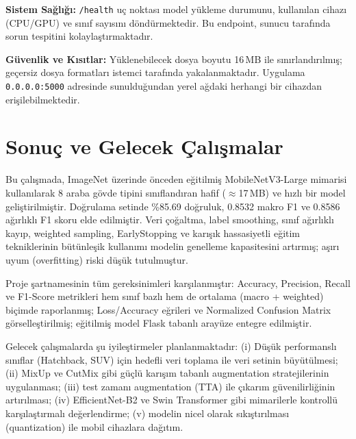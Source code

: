 \documentclass[conference]{IEEEtran}
\begin{document}
\textbf{Sistem Sağlığı:} \texttt{/health} uç noktası model yükleme
durumunu, kullanılan cihazı (CPU/GPU) ve sınıf sayısını döndürmektedir.
Bu endpoint, sunucu tarafında sorun tespitini kolaylaştırmaktadır.

\textbf{Güvenlik ve Kısıtlar:} Yüklenebilecek dosya boyutu 16\,MB ile
sınırlandırılmış; geçersiz dosya formatları istemci tarafında
yakalanmaktadır. Uygulama \texttt{0.0.0.0:5000} adresinde sunulduğundan
yerel ağdaki herhangi bir cihazdan erişilebilmektedir.

\section{Sonuç ve Gelecek Çalışmalar}

Bu çalışmada, ImageNet üzerinde önceden eğitilmiş MobileNetV3-Large
mimarisi kullanılarak 8 araba gövde tipini sınıflandıran hafif
($\approx$17\,MB) ve hızlı bir model geliştirilmiştir. Doğrulama
setinde \%85.69 doğruluk, 0.8532 makro F1 ve 0.8586 ağırlıklı F1
skoru elde edilmiştir. Veri çoğaltma, label smoothing, sınıf ağırlıklı
kayıp, weighted sampling, EarlyStopping ve karışık hassasiyetli eğitim
tekniklerinin bütünleşik kullanımı modelin genelleme kapasitesini
artırmış; aşırı uyum (overfitting) riski düşük tutulmuştur.

Proje şartnamesinin tüm gereksinimleri karşılanmıştır:
Accuracy, Precision, Recall ve F1-Score metrikleri hem sınıf
bazlı hem de ortalama (macro + weighted) biçimde raporlanmış;
Loss/Accuracy eğrileri ve Normalized Confusion Matrix görselleştirilmiş;
eğitilmiş model Flask tabanlı arayüze entegre edilmiştir.

Gelecek çalışmalarda şu iyileştirmeler planlanmaktadır: (i) Düşük
performanslı sınıflar (Hatchback, SUV) için hedefli veri toplama ile
veri setinin büyütülmesi; (ii) MixUp ve CutMix gibi güçlü karışım
tabanlı augmentation stratejilerinin uygulanması; (iii) test zamanı
augmentation (TTA) ile çıkarım güvenilirliğinin artırılması; (iv)
EfficientNet-B2 ve Swin Transformer gibi mimarilerle kontrollü
karşılaştırmalı değerlendirme; (v) modelin nicel olarak sıkıştırılması
(quantization) ile mobil cihazlara dağıtım.
\end{document}
